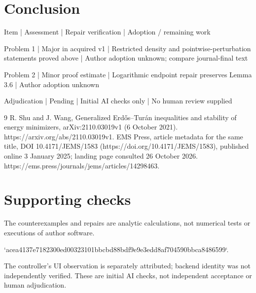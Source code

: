 \documentclass[10pt]{article}
\begin{document}
\section*{Conclusion}
Item | Assessment | Repair verification | Adoption / remaining work\par
Problem 1 | Major in acquired v1 | Restricted density and pointwise-perturbation statements proved above | Author adoption unknown; compare journal-final text\par
Problem 2 | Minor proof estimate | Logarithmic endpoint repair preserves Lemma 3.6 | Author adoption unknown\par
Adjudication | Pending | Initial AI checks only | No human review supplied\par
9 R. Shu and J. Wang, Generalized Erdős–Turán inequalities and stability of energy minimizers, arXiv:2110.03019v1 (6 October 2021). https://arxiv.org/abs/2110.03019v1. EMS Press, article metadata for the same title, DOI 10.4171/JEMS/1583 (https://doi.org/10.4171/JEMS/1583), published online 3 January 2025; landing page consulted 26 October 2026. https://ems.press/journals/jems/articles/14298463.\par
\section*{Supporting checks}
The counterexamples and repairs are analytic calculations, not numerical tests or executions of author software.\par
`acea4137e7182300ed00323101bbcbd88bdf9e9e3edd8af704590bbca8486599`.\par
The controller’s UI observation is separately attributed; backend identity was not independently verified. These are initial AI checks, not independent acceptance or human adjudication.\par
\end{document}
